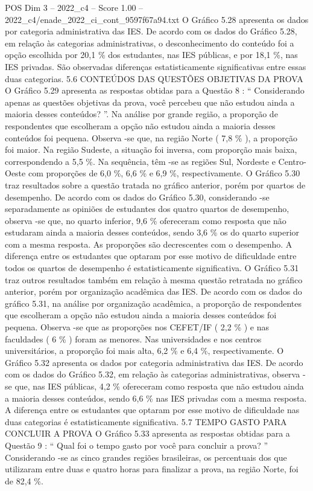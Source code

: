 \begin{textsample}{POS Dim 3 – 2022\_c4 – Score 1.00 – 2022\_c4/enade\_2022\_ci\_cont\_9597f67a94.txt}
O Gráfico 5.28 apresenta os dados por categoria administrativa das IES.
De acordo com os dados do Gráfico 5.28, em relação às categorias administrativas, o desconhecimento do conteúdo foi a opção escolhida por 20,1 \% dos estudantes, nas IES públicas, e por 18,1 \%, nas IES privadas.
São observadas diferenças estatisticamente significativas entre essas duas categorias. 5.6 CONTEÚDOS DAS QUESTÕES OBJETIVAS DA PROVA O Gráfico 5.29 apresenta as respostas obtidas para a Questão 8 : “ Considerando apenas as questões objetivas da prova, você percebeu que não estudou ainda a maioria desses conteúdos? ”.
Na análise por grande região, a proporção de respondentes que escolheram a opção não estudou ainda a maioria desses conteúdos foi pequena.
Observa -se que, na região Norte ( 7,8 \% ), a proporção foi maior.
Na região Sudeste, a situação foi inversa, com proporção mais baixa, correspondendo a 5,5 \%.
Na sequência, têm -se as regiões Sul, Nordeste e Centro-Oeste com proporções de 6,0 \%, 6,6 \% e 6,9 \%, respectivamente.
O Gráfico 5.30 traz resultados sobre a questão tratada no gráfico anterior, porém por quartos de desempenho.
De acordo com os dados do Gráfico 5.30, considerando -se separadamente as opiniões de estudantes dos quatro quartos de desempenho, observa -se que, no quarto inferior, 9,6 \% ofereceram como resposta que não estudaram ainda a maioria desses conteúdos, sendo 3,6 \% os do quarto superior com a mesma resposta.
As proporções são decrescentes com o desempenho.
A diferença entre os estudantes que optaram por esse motivo de dificuldade entre todos os quartos de desempenho é estatisticamente significativa.
O Gráfico 5.31 traz outros resultados também em relação à mesma questão retratada no gráfico anterior, porém por organização acadêmica das IES.
De acordo com os dados do gráfico 5.31, na análise por organização acadêmica, a proporção de respondentes que escolheram a opção não estudou ainda a maioria desses conteúdos foi pequena.
Observa -se que as proporções nos CEFET/IF ( 2,2 \% ) e nas faculdades ( 6 \% ) foram as menores.
Nas universidades e nos centros universitários, a proporção foi mais alta, 6,2 \% e 6,4 \%, respectivamente.
O Gráfico 5.32 apresenta os dados por categoria administrativa das IES.
De acordo com os dados do Gráfico 5.32, em relação às categorias administrativas, observa -se que, nas IES públicas, 4,2 \% ofereceram como resposta que não estudou ainda a maioria desses conteúdos, sendo 6,6 \% nas IES privadas com a mesma resposta.
A diferença entre os estudantes que optaram por esse motivo de dificuldade nas duas categorias é estatisticamente significativa. 5.7 TEMPO GASTO PARA CONCLUIR A PROVA O Gráfico 5.33 apresenta as respostas obtidas para a Questão 9 : “ Qual foi o tempo gasto por você para concluir a prova? ” Considerando -se as cinco grandes regiões brasileiras, os percentuais dos que utilizaram entre duas e quatro horas para finalizar a prova, na região Norte, foi de 82,4 \%.

\end{textsample}

